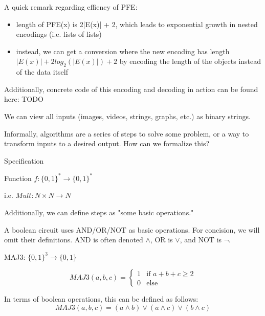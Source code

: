 A quick remark regarding effiency of PFE: 
\begin{itemize}
    \item length of PFE(x) is 2|E(x)| + 2, which leads to exponential growth in nested encodings (i.e. lists of lists)
    \item instead, we can get a conversion where the new encoding has length $|E(x)| + 2log_2(|E(x)|) + 2$ by encoding the length of the objects instead of the data itself
\end{itemize}

Additionally, concrete code of this encoding and decoding in action can be found here: TODO

\vspace{.5cm}

 We can view all inputs (images, videos, strings, graphs, etc.) as binary strings.

\hr


Informally, algorithms are a series of steps to solve some problem, or a way to transform inputs to a desired output. How can we formalize this?

\begin{definition}
    Specification
    
    Function $f: \{0,1\}^* \rightarrow \{0,1\}^*$
    
    i.e. $Mult: N \times N \rightarrow N$
\end{definition}

Additionally, we can define steps as "some basic operations."

\vspace{.5cm}

A boolean circuit uses AND/OR/NOT as basic operations. For concision, we will omit their definitions. AND is often denoted $\land$, OR is $\lor$, and NOT is $\lnot$.

\begin{example}
    MAJ3: $\{0, 1\}^3 \rightarrow \{0,1\}$

    \begin{equation}
        MAJ3(a, b, c)= 
        \begin{cases}
            1 & \text{if } a + b + c \ge 2 \\
            0 & \text{else}
        \end{cases}
    \end{equation}

    In terms of boolean operations, this can be defined as follows:
    \[
        MAJ3(a,b,c) = (a \land b) \lor (a \land c) \lor (b \land c)
    \]
\end{example}

